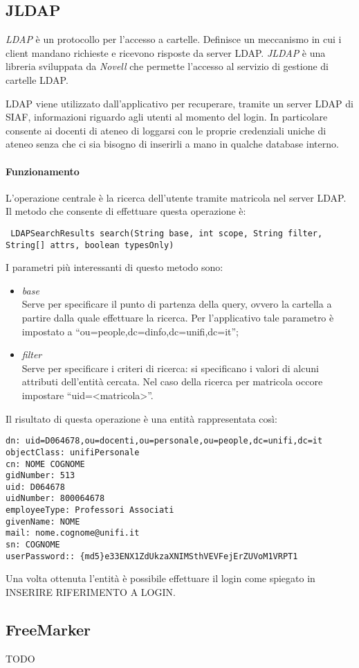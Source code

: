\subsection{JLDAP}
\textsl{LDAP} è un protocollo per l'accesso a cartelle. Definisce un meccanismo in cui i client mandano richieste e ricevono risposte da server LDAP.
\textsl{JLDAP} è una libreria sviluppata da \textsl{Novell} che permette l'accesso al servizio di gestione di cartelle LDAP.

LDAP viene utilizzato dall'applicativo per recuperare, tramite un server LDAP di SIAF, informazioni riguardo agli utenti al momento del login. In particolare consente ai docenti di ateneo di loggarsi con le proprie credenziali uniche di ateneo 
senza che ci sia bisogno di inserirli a mano in qualche database interno.

\paragraph{Funzionamento}
L'operazione centrale è la ricerca dell'utente tramite matricola nel server LDAP. Il metodo che consente di effettuare questa operazione è:

\begin{lstlisting}
 LDAPSearchResults search(String base, int scope, String filter, String[] attrs, boolean typesOnly) 
\end{lstlisting}

I parametri più interessanti di questo metodo sono:
\begin{itemize}
 \item \textsl{base}\\
  Serve per specificare il punto di partenza della query, ovvero la cartella a partire dalla quale effettuare la ricerca. Per l'applicativo tale parametro è impostato a ``ou=people,dc=dinfo,dc=unifi,dc=it'';
  \item \textsl{filter}\\
  Serve per specificare i criteri di ricerca: si specificano i valori di alcuni attributi dell'entità cercata. Nel caso della ricerca per matricola occore impostare ``uid=<matricola>''.
\end{itemize}

Il risultato di questa operazione è una entità rappresentata così:

\begin{lstlisting}
dn: uid=D064678,ou=docenti,ou=personale,ou=people,dc=unifi,dc=it
objectClass: unifiPersonale
cn: NOME COGNOME
gidNumber: 513
uid: D064678
uidNumber: 800064678
employeeType: Professori Associati
givenName: NOME
mail: nome.cognome@unifi.it
sn: COGNOME
userPassword:: {md5}e33ENX1ZdUkzaXNIMSthVEVFejErZUVoM1VRPT1
\end{lstlisting}

Una volta ottenuta l'entità è possibile effettuare il login come spiegato in INSERIRE RIFERIMENTO A LOGIN.






\subsection{FreeMarker}
TODO
